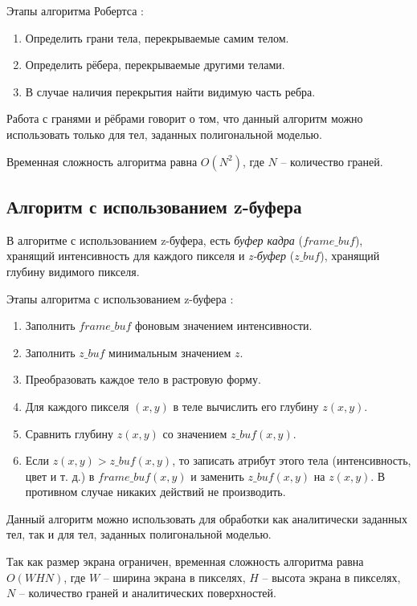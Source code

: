 Этапы алгоритма Робертса \cite{tomsk_2011}:
\begin{enumerate}[label=\arabic*)]
    \item Определить грани тела, перекрываемые самим телом. 
    \item Определить рёбера, перекрываемые другими телами.
    \item В случае наличия перекрытия найти видимую часть ребра.
\end{enumerate}

Работа с гранями и рёбрами говорит о том, что данный алгоритм можно использовать только для тел, заданных полигональной моделью.

Временная сложность алгоритма равна $O(N^2)$, где $N$ -- количество граней.



\subsection{Алгоритм с использованием z-буфера}

В алгоритме с использованием z-буфера, есть \textit{буфер кадра} ($frame\_buf$), хранящий интенсивность для каждого пикселя и \textit{z-буфер} ($z\_buf$), хранящий глубину видимого пикселя.

Этапы алгоритма с использованием z-буфера  \cite{tomsk_2011}:
\begin{enumerate}[label=\arabic*)]
    \item Заполнить $frame\_buf$ фоновым значением интенсивности. 
    \item Заполнить $z\_buf$ минимальным значением $z$.
    \item Преобразовать каждое тело в растровую форму.
    \item Для каждого пикселя $(x, y)$ в теле вычислить его глубину $z(x, y)$.
    \item Сравнить глубину $z(x, y)$ со значением $z\_buf(x, y)$.
    \item Если $z(x, y) > z\_buf(x, y)$, то записать атрибут этого тела (интенсивность, цвет и т. д.) в $frame\_buf(x, y)$ и заменить $z\_buf(x, y)$ на $z(x, y)$. В противном случае никаких действий не производить.
\end{enumerate}

Данный алгоритм можно использовать для обработки как аналитически заданных тел, так и для тел, заданных полигональной моделью.

Так как размер экрана ограничен, временная сложность алгоритма равна $O(WHN)$, где $W$ -- ширина экрана в пикселях, $H$ -- высота экрана в пикселях, $N$ -- количество граней и аналитических поверхностей.


